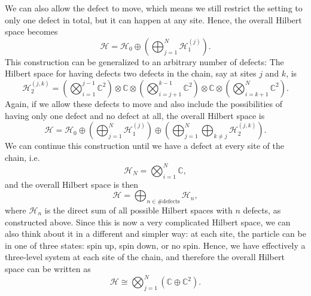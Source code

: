 We can also allow the defect to move, which means we still restrict the setting to only one defect in total, but it can happen at any site. Hence, the overall Hilbert space becomes
	\begin{equation}
		\mathcal{H}=\mathcal{H}_0\oplus\left(\bigoplus_{j=1}^N\mathcal{H}_1^{(j)}\right).
	\end{equation}
This construction can be generalized to an arbitrary number of defects: The Hilbert space for having defects two defects in the chain, say at sites $j$ and $k$, is 
	\begin{equation}
		\mathcal{H}_2^{(j,k)}=\left(\bigotimes_{i=1}^{j-1}\mathbb{C}^2\right)\otimes\mathbb{C}\otimes\left(\bigotimes_{i=j+1}^{k-1}\mathbb{C}^2\right)\otimes\mathbb{C}\otimes\left(\bigotimes_{i=k+1}^{N}\mathbb{C}^2\right).
	\end{equation}
Again, if we allow these defects to move and also include the possibilities of having only one defect and no defect at all, the overall Hilbert space is
	\begin{equation}
		\mathcal{H}=\mathcal{H}_0\oplus\left(\bigoplus_{j=1}^N\mathcal{H}_1^{(j)}\right)\oplus\left(\bigoplus_{j=1}^N\bigoplus_{k\neq j}\mathcal{H}_2^{(j,k)}\right).
	\end{equation}
We can continue this construction until we have a defect at every site of the chain, i.e.
	\begin{equation}
		\mathcal{H}_N=\bigotimes_{i=1}^N\mathbb{C},
	\end{equation}
and the overall Hilbert space is then
	\begin{equation}
		\mathcal{H}=\bigoplus_{n\in\#\mathrm{defects}}\mathcal{H}_n,
	\end{equation}
where $\mathcal{H}_n$ is the direct sum of all possible Hilbert spaces with $n$ defects, as constructed above. Since this is now a very complicated Hilbert space, we can also think about it in a different and simpler way: at each site, the particle can be in one of three states: spin up, spin down, or no spin. Hence, we have effectively a three-level system at each site of the chain, and therefore the overall Hilbert space can be written as
	\begin{equation}
		\mathcal{H}\cong\bigotimes_{j=1}^N\left(\mathbb{C}\oplus\mathbb{C}^2\right).
	\end{equation}

